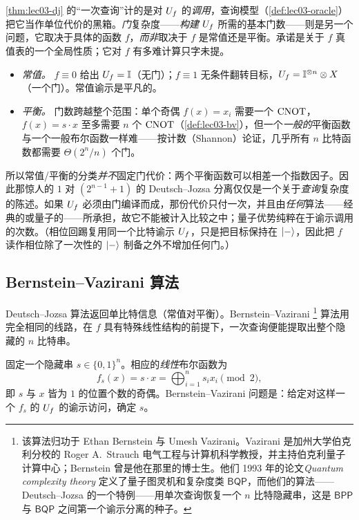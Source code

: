 \begin{remark}
\label{rem:lec03-dj-gatecost}
\cref{thm:lec03-dj} 的“一次查询”计的是对 $U_{f}$ 的\emph{调用}，查询模型（\cref{def:lec03-oracle}）把它当作单位代价的黑箱。\emph{门}复杂度——\emph{构建} $U_{f}$ 所需的基本门数——则是另一个问题，它取决于具体的函数 $f$，\emph{而非}取决于 $f$ 是常值还是平衡。承诺是关于 $f$ 真值表的一个全局性质；它对 $f$ 有多难计算只字未提。
\begin{itemize}[leftmargin=1.4em,nosep]
  \item \emph{常值。} $f\equiv0$ 给出 $U_{f}=\mathbb{I}$（无门）；$f\equiv1$ 无条件翻转目标，$U_{f}=\mathbb{I}^{\otimes n}\otimes X$（一个门）。常值谕示是平凡的。
  \item \emph{平衡。} 门数跨越整个范围：单个奇偶 $f(x)=x_i$ 需要一个 $\mathrm{CNOT}$，$f(x)=s\cdot x$ 至多需要 $n$ 个 $\mathrm{CNOT}$（\cref{def:lec03-bv}），但一个\emph{一般的}平衡函数与一个一般布尔函数一样难——按计数（Shannon）论证，几乎所有 $n$ 比特函数都需要 $\Theta(2^n/n)$ 个门。
\end{itemize}
所以常值/平衡的分类\emph{并不}固定门代价：两个平衡函数可以相差一个指数因子。因此那惊人的 $1$ 对 $(2^{n-1}{+}1)$ 的 Deutsch--Jozsa 分离仅仅是一个关于\emph{查询}复杂度的陈述。如果 $U_{f}$ 必须由门编译而成，那份代价只付一次，并且由\emph{任何}算法——经典的或量子的——所承担，故它不能被计入比较之中；量子优势纯粹在于谕示调用的次数。（相位回踢复用同一个比特谕示 $U_{f}$，只是把目标保持在 $\ket{-}$，因此把 $f$ 读作相位除了一次性的 $\ket{-}$ 制备之外不增加任何门。）
\end{remark}

\subsection{Bernstein--Vazirani 算法}

Deutsch--Jozsa 算法返回单比特信息（常值对平衡）。Bernstein--Vazirani%
\footnote{该算法归功于 Ethan Bernstein 与 Umesh Vazirani。Vazirani 是加州大学伯克利分校的 Roger A.\ Strauch 电气工程与计算机科学教授，并主持伯克利量子计算中心；Bernstein 曾是他在那里的博士生。他们 1993 年的论文\emph{Quantum complexity theory} 定义了量子图灵机和复杂度类 $\mathsf{BQP}$，而他们的算法——Deutsch--Jozsa 的一个特例——用单次查询恢复一个 $n$ 比特隐藏串，这是 $\mathsf{BPP}$ 与 $\mathsf{BQP}$ 之间第一个谕示分离的种子。}
算法用完全相同的线路，在 $f$ 具有特殊线性结构的前提下，一次查询便能提取出整个隐藏的 $n$ 比特串。

\begin{definition}
\label{def:lec03-bv}
固定一个隐藏串 $s\in\{0,1\}^n$。相应的\emph{线性}布尔函数为
\[
  f_s(x)=s\cdot x=\bigoplus_{i=1}^{n}s_i x_i \pmod 2,
\]
即 $s$ 与 $x$ 皆为 $1$ 的位置个数的奇偶。Bernstein--Vazirani 问题是：给定对这样一个 $f_s$ 的 $U_{f}$ 的谕示访问，确定 $s$。
\end{definition}

